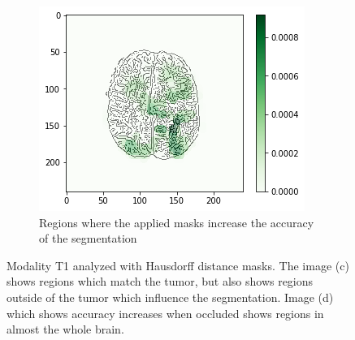 \begin{figure}[H]
\begin{subfigure}[t]{.45\textwidth}
    \end{subfigure}\hspace{1cm}%
    \begin{subfigure}[t]{.45\textwidth}
        \centering
        \includegraphics[width=\linewidth]{chapters/06_hdm/b_Brats18_TCIA08_242_1_L2/24.png}
        \caption{Regions where the applied masks increase the accuracy of the segmentation}
    \end{subfigure}
    \caption{Modality T1 analyzed with Hausdorff distance masks. The image (c) shows regions which match the tumor, but also shows regions outside of the tumor which influence the segmentation. Image (d) which shows accuracy increases when occluded shows regions in almost the whole brain.}
\end{figure}


